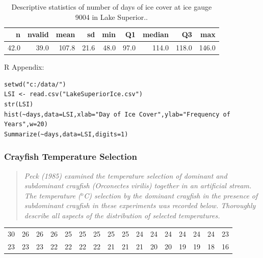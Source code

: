 \documentclass[10pt,openany]{book}\usepackage[]{graphicx}\usepackage[]{color}
\makeatletter
\newenvironment{kframe}{%
 \def\at@end@of@kframe{}%
 \ifinner\ifhmode%
  \def\at@end@of@kframe{\end{minipage}}%
  \begin{minipage}{\columnwidth}%
 \fi\fi%
 \def\FrameCommand##1{\hskip\@totalleftmargin \hskip-\fboxsep
 \colorbox{shadecolor}{##1}\hskip-\fboxsep
     \hskip-\linewidth \hskip-\@totalleftmargin \hskip\columnwidth}%
 \MakeFramed {\advance\hsize-\width
   \@totalleftmargin\z@ \linewidth\hsize
   \@setminipage}}%
 {\par\unskip\endMakeFramed%
 \at@end@of@kframe}
\newenvironment{knitrout}{}{} %
\makeatother
\begin{document}
\begin{table}[ht]
\centering
\caption{Descriptive statistics of number of days of ice cover at ice gauge 9004 in Lake Superior..} 
\label{tab:LSIStats}
\begin{tabular}{rrrrrrrrr}
  \hline
n & nvalid & mean & sd & min & Q1 & median & Q3 & max \\ 
  \hline
42.0 & 39.0 & 107.8 & 21.6 & 48.0 & 97.0 & 114.0 & 118.0 & 146.0 \\ 
   \hline
\end{tabular}
\end{table}


\begin{minipage}{\textwidth}
R Appendix:
\begin{knitrout}
\color{fgcolor}\begin{kframe}
\begin{verbatim}
setwd("c:/data/")
LSI <- read.csv("LakeSuperiorIce.csv")
str(LSI)
hist(~days,data=LSI,xlab="Day of Ice Cover",ylab="Frequency of Years",w=20)
Summarize(~days,data=LSI,digits=1)
\end{verbatim}
\end{kframe}
\end{knitrout}
\end{minipage}

\subsubsection{Crayfish Temperature Selection}
\begin{quote}
\textit{Peck (1985) examined the temperature selection of dominant and subdominant crayfish (\textit{Orconectes virilis}) together in an artificial stream. The temperature ($^{o}$C) selection by the dominant crayfish in the presence of subdominant crayfish in these experiments was recorded below. Thoroughly describe all aspects of the distribution of selected temperatures.}
\end{quote}

\begin{tabular}{rrrrrrrrrrrrrrrr}
  30 & 26 & 26 & 26 & 25 & 25 & 25 & 25 & 25 & 24 & 24 & 24 & 24 & 24 & 24 & 23 \\ 
  23 & 23 & 23 & 22 & 22 & 22 & 22 & 21 & 21 & 21 & 20 & 20 & 19 & 19 & 18 & 16 \\ 
  \end{tabular}
\end{document}
